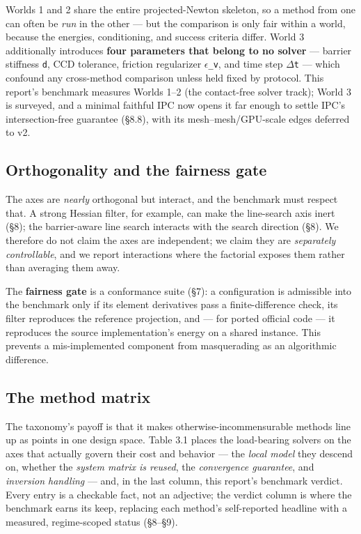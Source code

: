 \documentclass{egpubl}
\begin{document}
Worlds 1 and 2 share the entire projected-Newton skeleton, so a method from one can often be \emph{run} in
the other --- but the comparison is only fair within a world, because the energies, conditioning, and
success criteria differ. World 3 additionally introduces \textbf{four parameters that belong to no solver}
--- barrier stiffness \texttt{d}, CCD tolerance, friction regularizer \texttt{$\epsilon$\_v}, and time step \texttt{$\Delta$t} --- which
confound any cross-method comparison unless held fixed by protocol. This report's benchmark measures
Worlds 1--2 (the contact-free solver track); World 3 is surveyed, and a minimal faithful IPC now opens
it far enough to settle IPC's intersection-free guarantee (\S8.8), with its mesh--mesh/GPU-scale edges
deferred to v2.

\subsection{Orthogonality and the fairness gate}

The axes are \emph{nearly} orthogonal but interact, and the benchmark must respect that. A strong Hessian
filter, for example, can make the line-search axis inert (\S8); the barrier-aware line search interacts
with the search direction (\S8). We therefore do not claim the axes are independent; we claim they are
\emph{separately controllable}, and we report interactions where the factorial exposes them rather than
averaging them away.

The \textbf{fairness gate} is a conformance suite (\S7): a configuration is admissible into the benchmark
only if its element derivatives pass a finite-difference check, its filter reproduces the reference
projection, and --- for ported official code --- it reproduces the source implementation's energy on a
shared instance. This prevents a mis-implemented component from masquerading as an algorithmic
difference.

\subsection{The method matrix}

The taxonomy's payoff is that it makes otherwise-incommensurable methods line up as points in one
design space. Table 3.1 places the load-bearing solvers on the axes that actually govern their cost
and behavior --- the \emph{local model} they descend on, whether the \emph{system matrix is reused}, the
\emph{convergence guarantee}, and \emph{inversion handling} --- and, in the last column, this report's
benchmark verdict. Every entry is a checkable fact, not an adjective; the verdict column is where the
benchmark earns its keep, replacing each method's self-reported headline with a measured, regime-scoped
status (\S8--\S9).
\end{document}
